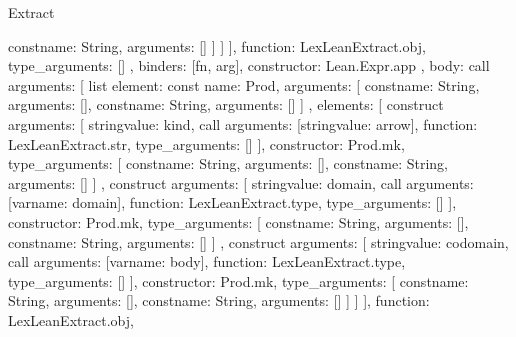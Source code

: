 \begin{lexlean}{Extract}
\begin{toolingmodule}
{{{{{{{                        const{name: String, arguments: []}
                      ]
                    }
                  ]
                }
              ],
              function: LexLeanExtract.obj,
              type_arguments: []
            },
            binders: [fn, arg],
            constructor: Lean.Expr.app
          },
          {
            body: call{
              arguments: [
                list{
                  element: const{
                    name: Prod,
                    arguments: [
                      const{name: String, arguments: []},
                      const{name: String, arguments: []}
                    ]
                  },
                  elements: [
                    construct{
                      arguments: [
                        string{value: kind},
                        call{
                          arguments: [string{value: arrow}],
                          function: LexLeanExtract.str,
                          type_arguments: []
                        }
                      ],
                      constructor: Prod.mk,
                      type_arguments: [
                        const{name: String, arguments: []},
                        const{name: String, arguments: []}
                      ]
                    },
                    construct{
                      arguments: [
                        string{value: domain},
                        call{
                          arguments: [var{name: domain}],
                          function: LexLeanExtract.type,
                          type_arguments: []
                        }
                      ],
                      constructor: Prod.mk,
                      type_arguments: [
                        const{name: String, arguments: []},
                        const{name: String, arguments: []}
                      ]
                    },
                    construct{
                      arguments: [
                        string{value: codomain},
                        call{
                          arguments: [var{name: body}],
                          function: LexLeanExtract.type,
                          type_arguments: []
                        }
                      ],
                      constructor: Prod.mk,
                      type_arguments: [
                        const{name: String, arguments: []},
                        const{name: String, arguments: []}
                      ]
                    }
                  ]
                }
              ],
              function: LexLeanExtract.obj,
}}}}}
\end{toolingmodule}
\end{lexlean}
